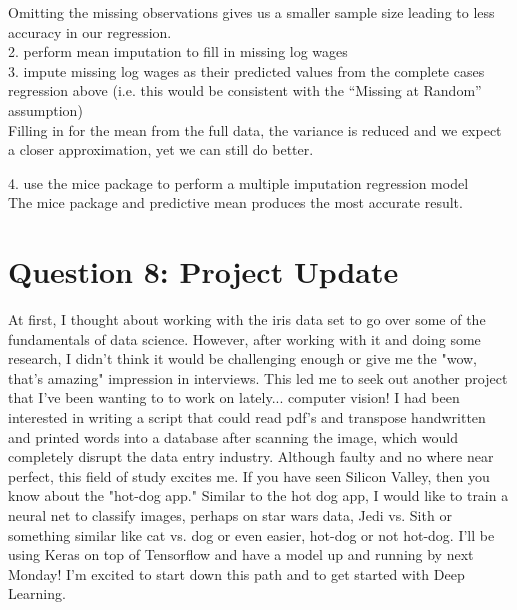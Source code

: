\documentclass{article}
\begin{document}
Omitting the missing observations gives us a smaller sample size leading to less accuracy in
our regression.\\


2. perform mean imputation to fill in missing log wages \\

3. impute missing log wages as their predicted values from the complete cases regression above (i.e. this would be consistent with the “Missing at Random” assumption)\\

Filling in for the mean from the full data, the variance is reduced and we expect a closer approximation, yet we can still do better.

4. use the mice package to perform a multiple imputation regression model \\
The mice package and predictive mean produces the most accurate result.



\section{Question 8: Project Update}
At first, I thought about working with the iris data set to go over some of the fundamentals of data science. However, after working with it and doing some research, I didn't think it would be challenging enough or give me the "wow, that's amazing" impression in interviews. This led me to seek out another project that I've been wanting to to work on lately... computer vision! I had been interested in writing a script that could read pdf's and transpose handwritten and printed words into a database after scanning the image, which would completely disrupt the data entry industry. Although faulty and no where near perfect, this field of study excites me. If you have seen Silicon Valley, then you know about the "hot-dog app." Similar to the hot dog app, I would like to train a neural net to classify images, perhaps on star wars data, Jedi vs. Sith or something similar like cat vs. dog or even easier, hot-dog or not hot-dog. I'll be using Keras on top of Tensorflow and have a model up and running by next Monday! I'm excited to start down this path and to get started with Deep Learning.
\end{document}
